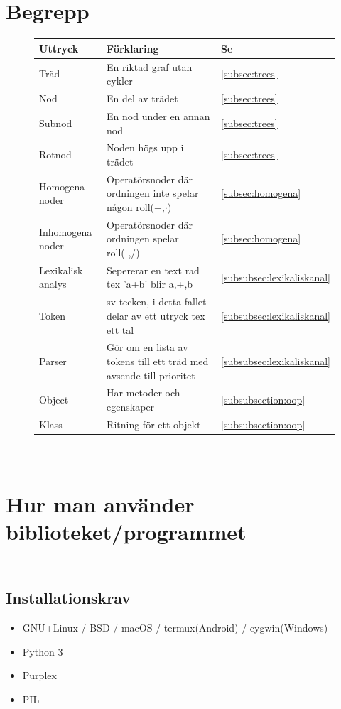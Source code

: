 \documentclass[12pt,a4paper]{article}
\begin{document}
\begin{appendices}
\section{\\Begrepp}
\begin{figure}[h!]
  \centering
  \begin{tabular}{l|l|l}
    \textbf{Uttryck} & \textbf{Förklaring} & \textbf{Se} \\
    \hline
    Träd & En riktad graf utan cykler & \ref{subsec:trees} \\
    Nod & En del av trädet & \ref{subsec:trees} \\
    Subnod & En nod under en annan nod & \ref{subsec:trees} \\
    Rotnod & Noden högs upp i trädet & \ref{subsec:trees} \\
    Homogena noder & Operatörsnoder där ordningen inte spelar någon roll(+,\(\cdot\)) & \ref{subsec:homogena} \\
    Inhomogena noder & Operatörsnoder där ordningen spelar roll(-,/) & \ref{subsec:homogena} \\
    Lexikalisk analys & Sepererar en text rad tex 'a+b' blir a,+,b & \ref{subsubsec:lexikaliskanal} \\
    Token & sv tecken, i detta fallet delar av ett utryck tex ett tal & \ref{subsubsec:lexikaliskanal} \\
    Parser & Gör om en lista av tokens till ett träd med avsende till prioritet & \ref{subsubsec:lexikaliskanal} \\
    Object & Har metoder och egenskaper & \ref{subsubsection:oop} \\
    Klass & Ritning för ett objekt & \ref{subsubsection:oop} \\
  \end{tabular}
\end{figure}
\section{\\Hur man använder biblioteket/programmet}
\subsection{\\Installationskrav}
\begin{itemize}
  \item GNU+Linux / BSD / macOS / termux(Android) / cygwin(Windows)
  \item Python 3
  \item Purplex
  \item PIL
\end{itemize}

\end{appendices}
\end{document}
